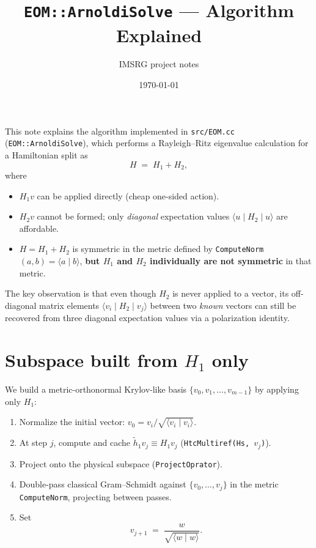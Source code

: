 \documentclass[11pt]{article}
\title{\texttt{EOM::ArnoldiSolve} --- Algorithm Explained}
\author{IMSRG project notes}
\date{\today}
\begin{document}
\maketitle
\tableofcontents
\bigskip

This note explains the algorithm implemented in
\texttt{src/EOM.cc} (\texttt{EOM::ArnoldiSolve}), which performs a
Rayleigh--Ritz eigenvalue calculation for a Hamiltonian split as
\begin{equation}
  H \;=\; H_1 + H_2,
\end{equation}
where
\begin{itemize}
  \item $H_1 v$ can be applied directly (cheap one-sided action).
  \item $H_2 v$ cannot be formed; only \emph{diagonal} expectation
        values $\langle u \mid H_2 \mid u \rangle$ are affordable.
  \item $H = H_1 + H_2$ is symmetric in the metric defined by
        \texttt{ComputeNorm}$(a,b) = \langle a \mid b \rangle$,
        \textbf{but $H_1$ and $H_2$ individually are not symmetric}
        in that metric.
\end{itemize}
The key observation is that even though $H_2$ is never applied to a
vector, its off-diagonal matrix elements
$\langle v_i \mid H_2 \mid v_j \rangle$ between two \emph{known}
vectors can still be recovered from three diagonal expectation values
via a polarization identity.

\section{Subspace built from $H_1$ only}

We build a metric-orthonormal Krylov-like basis
$\{v_0, v_1, \dots, v_{m-1}\}$ by applying only $H_1$:

\begin{enumerate}
  \item Normalize the initial vector:
        $v_0 = v_i \big/ \sqrt{\langle v_i \mid v_i \rangle}$.
  \item At step $j$, compute and cache
        $\tilde{h}_1 v_j \equiv H_1 v_j$
        (\texttt{HtcMultiref(Hs, $v_j$)}).
  \item Project onto the physical subspace (\texttt{ProjectOprator}).
  \item Double-pass classical Gram--Schmidt against
        $\{v_0, \dots, v_j\}$ in the metric \texttt{ComputeNorm},
        projecting between passes.
  \item Set
        \begin{equation}
          v_{j+1} \;=\; \frac{w}{\sqrt{\langle w \mid w \rangle}}.
        \end{equation}
\end{enumerate}
\end{document}
